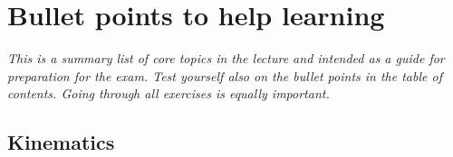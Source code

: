 

















\clearpage

\section{Bullet points to help learning}

\emph{This is a summary list of core topics in the lecture and
  intended as a guide for preparation for the exam. Test yourself also
  on the bullet points in the table of contents. Going through all
  exercises is equally important.}


\subsection{Kinematics}


